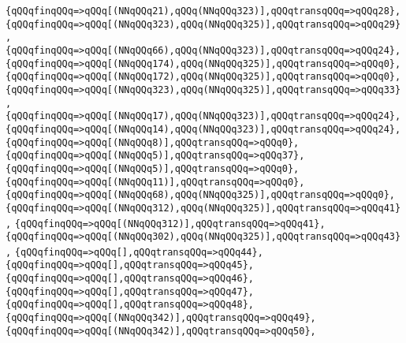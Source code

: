 \verb|{qQQqfinqQQq=>qQQq[(NNqQQq21),qQQq(NNqQQq323)],qQQqtransqQQq=>qQQq28},|\newline
\verb|{qQQqfinqQQq=>qQQq[(NNqQQq323),qQQq(NNqQQq325)],qQQqtransqQQq=>qQQq29},|\newline
\verb|{qQQqfinqQQq=>qQQq[(NNqQQq66),qQQq(NNqQQq323)],qQQqtransqQQq=>qQQq24},|\newline
\verb|{qQQqfinqQQq=>qQQq[(NNqQQq174),qQQq(NNqQQq325)],qQQqtransqQQq=>qQQq0},|\newline
\verb|{qQQqfinqQQq=>qQQq[(NNqQQq172),qQQq(NNqQQq325)],qQQqtransqQQq=>qQQq0},|\newline
\verb|{qQQqfinqQQq=>qQQq[(NNqQQq323),qQQq(NNqQQq325)],qQQqtransqQQq=>qQQq33},|\newline
\verb|{qQQqfinqQQq=>qQQq[(NNqQQq17),qQQq(NNqQQq323)],qQQqtransqQQq=>qQQq24},|\newline
\verb|{qQQqfinqQQq=>qQQq[(NNqQQq14),qQQq(NNqQQq323)],qQQqtransqQQq=>qQQq24},|\newline
\verb|{qQQqfinqQQq=>qQQq[(NNqQQq8)],qQQqtransqQQq=>qQQq0},|\newline
\verb|{qQQqfinqQQq=>qQQq[(NNqQQq5)],qQQqtransqQQq=>qQQq37},|\newline
\verb|{qQQqfinqQQq=>qQQq[(NNqQQq5)],qQQqtransqQQq=>qQQq0},|\newline
\verb|{qQQqfinqQQq=>qQQq[(NNqQQq11)],qQQqtransqQQq=>qQQq0},|\newline
\verb|{qQQqfinqQQq=>qQQq[(NNqQQq68),qQQq(NNqQQq325)],qQQqtransqQQq=>qQQq0},|\newline
\verb|{qQQqfinqQQq=>qQQq[(NNqQQq312),qQQq(NNqQQq325)],qQQqtransqQQq=>qQQq41},|\newline
\verb|{qQQqfinqQQq=>qQQq[(NNqQQq312)],qQQqtransqQQq=>qQQq41},|\newline
\verb|{qQQqfinqQQq=>qQQq[(NNqQQq302),qQQq(NNqQQq325)],qQQqtransqQQq=>qQQq43},|\newline
\verb|{qQQqfinqQQq=>qQQq[],qQQqtransqQQq=>qQQq44},|\newline
\verb|{qQQqfinqQQq=>qQQq[],qQQqtransqQQq=>qQQq45},|\newline
\verb|{qQQqfinqQQq=>qQQq[],qQQqtransqQQq=>qQQq46},|\newline
\verb|{qQQqfinqQQq=>qQQq[],qQQqtransqQQq=>qQQq47},|\newline
\verb|{qQQqfinqQQq=>qQQq[],qQQqtransqQQq=>qQQq48},|\newline
\verb|{qQQqfinqQQq=>qQQq[(NNqQQq342)],qQQqtransqQQq=>qQQq49},|\newline
\verb|{qQQqfinqQQq=>qQQq[(NNqQQq342)],qQQqtransqQQq=>qQQq50},|\newline
